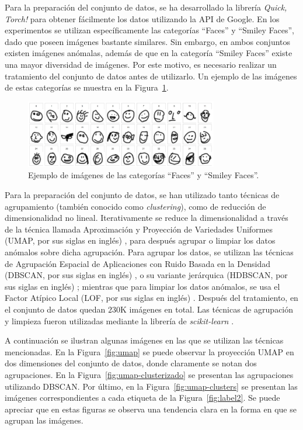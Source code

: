 Para la preparación del conjunto de datos, se ha desarrollado la librería \textit{Quick, Torch!} \cite{munoz2023quicktorch} para obtener fácilmente los datos utilizando la API de Google.
En los experimentos se utilizan específicamente las categorías ``Faces'' y ``Smiley Faces'', dado que poseen imágenes bastante similares. Sin embargo, en ambos conjuntos existen imágenes anómalas, además de que en la categoría ``Smiley Faces'' existe una mayor diversidad de imágenes. Por este motivo, es necesario realizar un tratamiento del conjunto de datos antes de utilizarlo. Un ejemplo de las imágenes de estas categorías se muestra en la Figura~\ref{fig:quick-draw-caras}.

\begin{figure}[htbp]
    \centering
    \includegraphics[width=0.75\textwidth]{img/quick-draw/caras.jpg}
    \caption{Ejemplo de imágenes de las categorías ``Faces'' y ``Smiley Faces''.}
    \label{fig:quick-draw-caras}
\end{figure}


Para la preparación del conjunto de datos, se han utilizado tanto técnicas de agrupamiento (también conocido como \textit{clustering}), como de reducción de dimensionalidad no lineal.
Iterativamente se reduce la dimensionalidad a través de la técnica llamada Aproximación y Proyección de Variedades Uniformes (UMAP, por sus siglas en inglés) \cite{mcinnes2018umap}, para después agrupar o limpiar los datos anómalos sobre dicha agrupación. Para agrupar los datos, se utilizan las técnicas de Agrupación Espacial de Aplicaciones con Ruido Basada en la Densidad (DBSCAN, por sus siglas en inglés) \cite{ester1996density}, o su variante jerárquica (HDBSCAN, por sus siglas en inglés) \cite{campello2013density};
mientras que para limpiar los datos anómalos, se usa el Factor Atípico Local (LOF, por sus siglas en inglés) \cite{breunig2000lof}. Después del tratamiento, en el conjunto de datos quedan $230$K imágenes en total. Las técnicas de agrupación y limpieza fueron utilizadas mediante la librería de \textit{scikit-learn} \cite{sklearn}.

A continuación se ilustran algunas imágenes en las que se utilizan las técnicas mencionadas.
En la Figura~\ref{fig:umap} se puede observar la proyección UMAP en dos dimensiones del conjunto de datos, donde claramente se notan dos agrupaciones. En la Figura~\ref*{fig:umap-clusterizado} se presentan las agrupaciones utilizando DBSCAN. Por último, en la Figura~\ref*{fig:umap-clusters} se presentan las imágenes correspondientes a cada etiqueta de la Figura~\ref*{fig:label2}. Se puede apreciar que en estas figuras se observa una tendencia clara en la forma en que se agrupan las imágenes.

